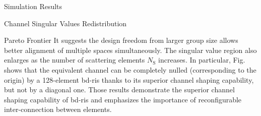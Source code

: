\documentclass[journal]{IEEEtran}
\begin{document}
\begin{section}{Simulation Results}
\begin{subsection}{Channel Singular Values Redistribution}
\begin{subsubsection}{Pareto Frontier}
			It suggests the design freedom from larger group size allows better alignment of multiple spaces simultaneously.
			The singular value region also enlarges as the number of scattering elements $N_\mathrm{S}$ increases.
			In particular, Fig.  shows that the equivalent channel can be completely nulled (corresponding to the origin) by a 128-element \gls{bd}-\gls{ris} thanks to its superior channel shaping capability, but not by a diagonal one.
			Those results demonstrate the superior channel shaping capability of \gls{bd}-\gls{ris} and emphasizes the importance of reconfigurable inter-connection between elements.
		\end{subsubsection}


\end{subsection}
\end{section}
\end{document}
